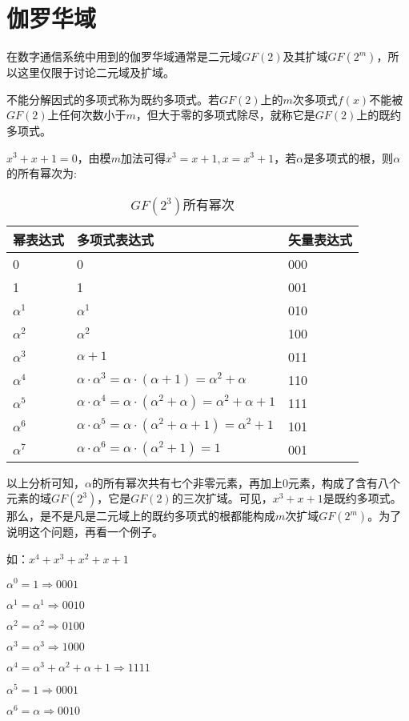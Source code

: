 \section{伽罗华域\cite{XiangXi_GF}}
在数字通信系统中用到的伽罗华域通常是二元域$GF(2)$及其扩域$GF(2^m)$，所以这里仅限于讨论二元域及扩域。
\begin{ioadefine}
  不能分解因式的多项式称为既约多项式。若$GF(2)$上的$m$次多项式$f(x)$不能被$GF(2)$上任何次数小于$m$，但大于零的多项式除尽，就称它是$GF(2)$上的既约多项式。
\end{ioadefine}
  \begin{ioaexample} 
    $x^3+x+1=0$，由模$m$加法可得$x^3=x+1,x=x^3+1$，若$\alpha$是多项式的根，则$\alpha$的所有幂次为:
    \begin{table}[htb]
      \centering
      \caption{$GF(2^3)$所有幂次}
      \label{tab:table2.3}
      \begin{tabular}{|C{3cm}|C{8cm}|C{3cm}|}
        \hline
        幂表达式&多项式表达式&矢量表达式\\
        \hline
        &0&000\\
        &1&001\\
        \hline
        $\alpha^1$&$\alpha^1$&010\\
        \hline
        $\alpha^2$&$\alpha^2$&100\\
        \hline
        $\alpha^3$&$\alpha+1$&011\\
        \hline
        $\alpha^4$&$\alpha\cdot \alpha^3=\alpha\cdot (\alpha+1)=\alpha^2+\alpha$&110\\
        \hline
        $\alpha^5$&$\alpha\cdot \alpha^4=\alpha\cdot
        (\alpha^2+\alpha)=\alpha^2+\alpha+1$&111\\
        \hline
        $\alpha^6$&$\alpha\cdot \alpha^5=\alpha\cdot (\alpha^2+\alpha+1)=\alpha^2+1$&101\\
        \hline
        $\alpha^7$&$\alpha\cdot \alpha^6=\alpha\cdot (\alpha^2+1)=1$&001\\
        \hline
      \end{tabular}
    \end{table}
  \end{ioaexample}
以上分析可知，$\alpha$的所有幂次共有七个非零元素，再加上0元素，构成了含有八个元素的域$GF(2^3)$，它是$GF(2)$的三次扩域。可见，$x^3+x+1$是既约多项式。那么，是不是凡是二元域上的既约多项式的根都能构成$m$次扩域$GF(2^m)$。为了说明这个问题，再看一个例子。
\begin{ioaexample}
  如：$x^4+x^3+x^2+x+1$
  \begin{description}
    \item $\alpha^0=1\Rightarrow 0001$
    \item $\alpha^1=\alpha^1\Rightarrow 0010$
    \item $\alpha^2=\alpha^2\Rightarrow 0100$
    \item $\alpha^3=\alpha^3\Rightarrow 1000$
    \item $\alpha^4=\alpha^3+\alpha^2+\alpha+1\Rightarrow 1111$
    \item $\alpha^5=1\Rightarrow 0001$
    \item $\alpha^6=\alpha\Rightarrow 0010$
  \end{description}
\end{ioaexample}
